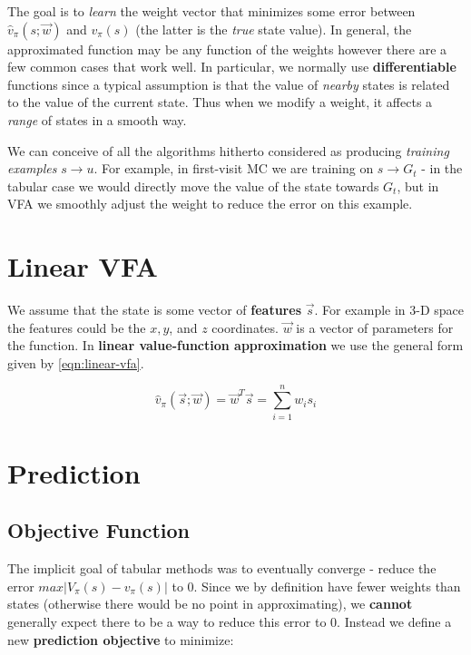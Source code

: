 \documentclass[11pt]{report}
\begin{document}
The goal is to \textit{learn} the weight vector that minimizes some error between $\hat{v}_\pi(s; \vec{w})$ and $v_\pi(s)$ (the latter is the \textit{true} state value). In general, the approximated function may be any function of the weights however there are a few common cases that work well. In particular, we normally use \textbf{differentiable} functions since a typical assumption is that the value of \textit{nearby} states is related to the value of the current state. Thus when we modify a weight, it affects a \textit{range} of states in a smooth way.

We can conceive of all the algorithms hitherto considered as producing \textit{training examples} $s \xrightarrow{} u$. For example, in first-visit MC we are training on $s \xrightarrow{} G_t$ - in the tabular case we would directly move the value of the state towards $G_t$, but in VFA we smoothly adjust the weight to reduce the error on this example.

\section{Linear VFA}
We assume that the state is some vector of \textbf{features} $\vec{s}$. For example in 3-D space the features could be the $x, y$, and $z$ coordinates. $\vec{w}$ is a vector of parameters for the function. In \textbf{linear value-function approximation} we use the general form given by \autoref{eqn:linear-vfa}.

\begin{equation}
	\label{eqn:linear-vfa}
	\hat{v}_\pi(\vec{s};\vec{w}) = \vec{w}^T \vec{s} = \sum_{i=1}^{n} w_is_i
\end{equation}


\section{Prediction}

\subsection{Objective Function}\label{sec:vfa-objective-function}
The implicit goal of tabular methods was to eventually converge - reduce the error $max|V_\pi(s) - v_\pi(s)|$ to 0. Since we by definition have fewer weights than states (otherwise there would be no point in approximating), we \textbf{cannot} generally expect there to be a way to reduce this error to 0. Instead we define a new \textbf{prediction objective} to minimize:
\end{document}
